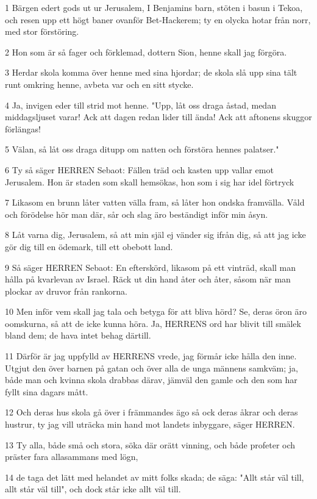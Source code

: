 \par 1 Bärgen edert gods ut ur Jerusalem, I Benjamins barn, stöten i basun i Tekoa, och resen upp ett högt baner ovanför Bet-Hackerem; ty en olycka hotar från norr, med stor förstöring.
\par 2 Hon som är så fager och förklemad, dottern Sion, henne skall jag förgöra.
\par 3 Herdar skola komma över henne med sina hjordar; de skola slå upp sina tält runt omkring henne, avbeta var och en sitt stycke.
\par 4 Ja, invigen eder till strid mot henne. "Upp, låt oss draga åstad, medan middagsljuset varar! Ack att dagen redan lider till ända! Ack att aftonens skuggor förlängas!
\par 5 Välan, så låt oss draga ditupp om natten och förstöra hennes palatser."
\par 6 Ty så säger HERREN Sebaot: Fällen träd och kasten upp vallar emot Jerusalem. Hon är staden som skall hemsökas, hon som i sig har idel förtryck
\par 7 Likasom en brunn låter vatten välla fram, så låter hon ondska framvälla. Våld och förödelse hör man där, sår och slag äro beständigt inför min åsyn.
\par 8 Låt varna dig, Jerusalem, så att min själ ej vänder sig ifrån dig, så att jag icke gör dig till en ödemark, till ett obebott land.
\par 9 Så säger HERREN Sebaot: En efterskörd, likasom på ett vinträd, skall man hålla på kvarlevan av Israel. Räck ut din hand åter och åter, såsom när man plockar av druvor från rankorna.
\par 10 Men inför vem skall jag tala och betyga för att bliva hörd? Se, deras öron äro oomskurna, så att de icke kunna höra. Ja, HERRENS ord har blivit till smälek bland dem; de hava intet behag därtill.
\par 11 Därför är jag uppfylld av HERRENS vrede, jag förmår icke hålla den inne. Utgjut den över barnen på gatan och över alla de unga männens samkväm; ja, både man och kvinna skola drabbas därav, jämväl den gamle och den som har fyllt sina dagars mått.
\par 12 Och deras hus skola gå över i främmandes ägo så ock deras åkrar och deras hustrur, ty jag vill uträcka min hand mot landets inbyggare, säger HERREN.
\par 13 Ty alla, både små och stora, söka där orätt vinning, och både profeter och präster fara allasammans med lögn,
\par 14 de taga det lätt med helandet av mitt folks skada; de säga: "Allt står väl till, allt står väl till", och dock står icke allt väl till.
